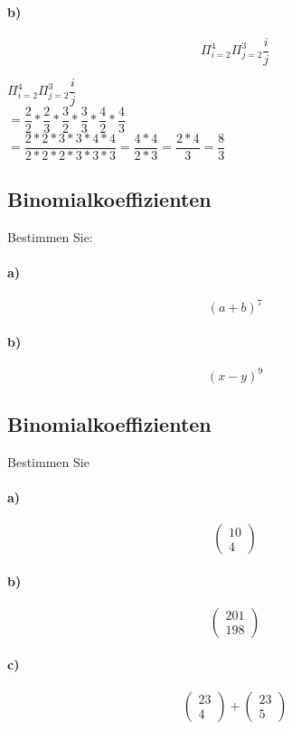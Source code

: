 \documentclass[paper=a4, fontsize=11pt]{scrartcl}
\numberwithin{equation}{section}
\numberwithin{figure}{section}
\numberwithin{table}{section}
\begin{document}
\paragraph{b)}
$$\Pi^{4}_{i=2} \Pi^{3}_{j=2} \dfrac{i}{j}$$

$\Pi^{4}_{i=2} \Pi^{3}_{j=2} \dfrac{i}{j}$ \\
$= \dfrac{2}{2} * \dfrac{2}{3}
* \dfrac{3}{2} * \dfrac{3}{3} 
* \dfrac{4}{2} * \dfrac{4}{3}$ \\
$= \dfrac{2*2*3*3*4*4}{2*2*2*3*3*3}
= \dfrac{4*4}{2*3}
= \dfrac{2*4}{3}
= \dfrac{8}{3}$
\subsection{Binomialkoeffizienten}
Bestimmen Sie:
\paragraph{a)}
$$(a+b)^{7}$$

\paragraph{b)}
$$(x-y)^{9}$$

\subsection{Binomialkoeffizienten}
Bestimmen Sie
\paragraph{a)}
$$\left(\begin{array}{c} 10 \\ 4 \end{array}\right)$$

\paragraph{b)}
$$\left(\begin{array}{c} 201 \\ 198 \end{array}\right)$$

\paragraph{c)}
$$\left(\begin{array}{c} 23 \\ 4 \end{array}\right)+\left(\begin{array}{c} 23 \\ 5 \end{array}\right)$$
\end{document}
